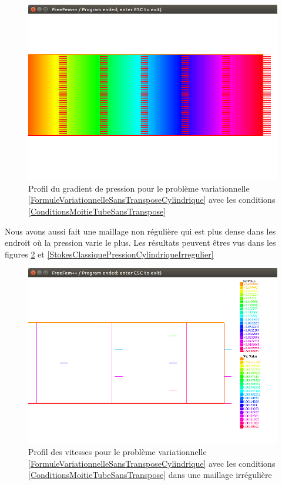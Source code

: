 \documentclass[11pt,a4paper]{article}
\numberwithin{equation}{subsection}
\numberwithin{figure}{subsection}
\begin{document}
\begin{figure}
\centering
\includegraphics[scale=0.4]{StokesClassiquePressionCylindrique.png}
\caption{Profil du gradient de pression pour le problème variationnelle \ref{FormuleVariationnelleSansTransposeCylindrique} avec les conditions \ref{ConditionsMoitieTubeSansTranspose}}
\label{StokesClassiquePressionCylindrique}
\end{figure}

Nous avons aussi fait une maillage non régulière qui est plus dense dans les endroit où la pression varie le plus. Les résultats peuvent êtres vus dans les figures \ref{StokesClassiqueVitessesCylindriqueIrregulier} et \ref{StokesClassiquePressionCylindriqueIrregulier}

\begin{figure}
\centering
\includegraphics[scale=0.4]{StokesClassiqueVitessesCylindriqueIrregulier.png}
\caption{Profil des vitesses pour le problème variationnelle \ref{FormuleVariationnelleSansTransposeCylindrique} avec les conditions \ref{ConditionsMoitieTubeSansTranspose} dans une maillage irrégulière}
\label{StokesClassiqueVitessesCylindriqueIrregulier}
\end{figure}
\end{document}
